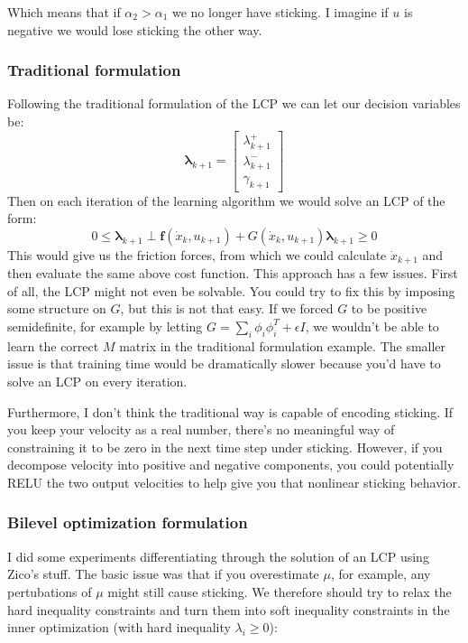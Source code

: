 \documentclass{article}
\renewcommand{\vec}[1]{\boldsymbol{#1}}
\begin{document}
Which means that if $\alpha_2 > \alpha_1$ we no longer have sticking. I imagine if $u$ is negative we would lose sticking the other way.

\subsubsection{Traditional formulation}
Following the traditional formulation of the LCP we can let our decision variables be:
\[
    \vec{\lambda}_{k+1} =
    \begin{bmatrix}
        \lambda^+_{k+1} \\
        \lambda^-_{k+1} \\
        \gamma_{k+1}
    \end{bmatrix}
\]
Then on each iteration of the learning algorithm we would solve an LCP of the form:
\[
    0 \leq \vec{\lambda}_{k+1} \perp \vec{f}(\dot x_k, u_{k+1}) + G(\dot x_k, u_{k+1}) \vec{\lambda}_{k+1} \geq 0
\]
This would give us the friction forces, from which we could calculate $\dot x_{k+1}$ and then evaluate the same above cost function. This approach has a few issues. First of all, the LCP might not even be solvable. You could try to fix this by imposing some structure on $G$, but this is not that easy. If we forced $G$ to be positive semidefinite, for example by letting $G = \sum _i \phi_i \phi_i^T + \epsilon I$, we wouldn't be able to learn the correct $M$ matrix in the traditional formulation example. The smaller issue is that training time would be dramatically slower because you'd have to solve an LCP on every iteration.

Furthermore, I don't think the traditional way is capable of encoding sticking. If you keep your velocity as a real number, there's no meaningful way of constraining it to be zero in the next time step under sticking. However, if you decompose velocity into positive and negative components, you could potentially RELU the two output velocities to help give you that nonlinear sticking behavior.

\subsubsection{Bilevel optimization formulation}
I did some experiments differentiating through the solution of an LCP using Zico's stuff. The basic issue was that if you overestimate $\mu$, for example, any pertubations of $\mu$ might still cause sticking. We therefore should try to relax the hard inequality constraints and turn them into soft inequality constraints in the inner optimization (with hard inequality $\lambda_i \geq 0$):
\end{document}
